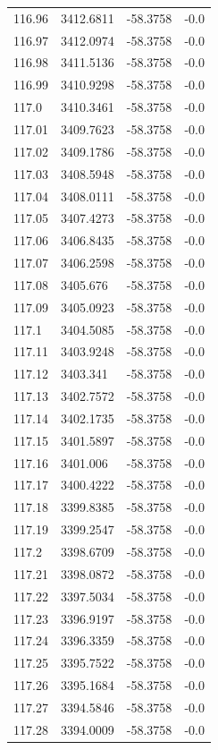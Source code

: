 \begin{table}[H]
\begin{tabular}{llll}
116.96 & 3412.6811 & -58.3758 & -0.0 \\
116.97 & 3412.0974 & -58.3758 & -0.0 \\
116.98 & 3411.5136 & -58.3758 & -0.0 \\
116.99 & 3410.9298 & -58.3758 & -0.0 \\
117.0 & 3410.3461 & -58.3758 & -0.0 \\
117.01 & 3409.7623 & -58.3758 & -0.0 \\
117.02 & 3409.1786 & -58.3758 & -0.0 \\
117.03 & 3408.5948 & -58.3758 & -0.0 \\
117.04 & 3408.0111 & -58.3758 & -0.0 \\
117.05 & 3407.4273 & -58.3758 & -0.0 \\
117.06 & 3406.8435 & -58.3758 & -0.0 \\
117.07 & 3406.2598 & -58.3758 & -0.0 \\
117.08 & 3405.676 & -58.3758 & -0.0 \\
117.09 & 3405.0923 & -58.3758 & -0.0 \\
117.1 & 3404.5085 & -58.3758 & -0.0 \\
117.11 & 3403.9248 & -58.3758 & -0.0 \\
117.12 & 3403.341 & -58.3758 & -0.0 \\
117.13 & 3402.7572 & -58.3758 & -0.0 \\
117.14 & 3402.1735 & -58.3758 & -0.0 \\
117.15 & 3401.5897 & -58.3758 & -0.0 \\
117.16 & 3401.006 & -58.3758 & -0.0 \\
117.17 & 3400.4222 & -58.3758 & -0.0 \\
117.18 & 3399.8385 & -58.3758 & -0.0 \\
117.19 & 3399.2547 & -58.3758 & -0.0 \\
117.2 & 3398.6709 & -58.3758 & -0.0 \\
117.21 & 3398.0872 & -58.3758 & -0.0 \\
117.22 & 3397.5034 & -58.3758 & -0.0 \\
117.23 & 3396.9197 & -58.3758 & -0.0 \\
117.24 & 3396.3359 & -58.3758 & -0.0 \\
117.25 & 3395.7522 & -58.3758 & -0.0 \\
117.26 & 3395.1684 & -58.3758 & -0.0 \\
117.27 & 3394.5846 & -58.3758 & -0.0 \\
117.28 & 3394.0009 & -58.3758 & -0.0 \\

\end{tabular}
\end{table}
